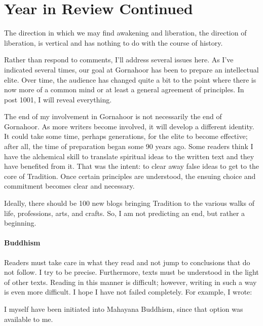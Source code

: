 \section{Year in Review Continued}

\begin{quotex}
The direction in which we may find awakening and liberation, the direction of liberation, is vertical and has nothing to do with the course of history.
\end{quotex}


Rather than respond to comments, I'll address several issues here. As I've indicated several times, our goal at Gornahoor has been to prepare an intellectual elite. Over time, the audience has changed quite a bit to the point where there is now more of a common mind or at least a general agreement of principles. In post 1001, I will reveal everything.

The end of my involvement in Gornahoor is not necessarily the end of Gornahoor. As more writers become involved, it will develop a different identity. It could take some time, perhaps generations, for the elite to become effective; after all, the time of preparation began some 90 years ago. Some readers think I have the alchemical skill to translate spiritual ideas to the written text and they have benefited from it. That was the intent: to clear away false ideas to get to the core of Tradition. Once certain principles are understood, the ensuing choice and commitment becomes clear and necessary.

Ideally, there should be 100 new blogs bringing Tradition to the various walks of life, professions, arts, and crafts. So, I am not predicting an end, but rather a beginning.

\paragraph{Buddhism}


Readers must take care in what they read and not jump to conclusions that do not follow. I try to be precise. Furthermore, texts must be understood in the light of other texts. Reading in this manner is difficult; however, writing in such a way is even more difficult. I hope I have not failed completely. For example, I wrote:

\begin{quotex}
I myself have been initiated into Mahayana Buddhism, since that option was available to me.
\end{quotex}


